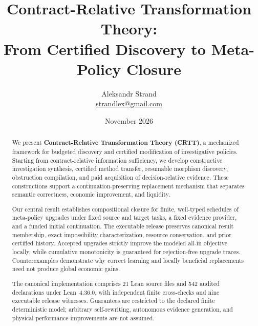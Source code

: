 
\title{\textbf{Contract-Relative Transformation Theory:}\\
\large From Certified Discovery to Meta-Policy Closure}

\author{Aleksandr Strand\\[-1pt]{\small\href{mailto:strandlex@gmail.com}{strandlex@gmail.com}}}
\date{\vspace{-11pt}November 2026}

\maketitle

\begin{abstract}
We present \textbf{Contract-Relative Transformation Theory (CRTT)}, a mechanized framework for budgeted discovery and certified modification of investigative policies. Starting from contract-relative information sufficiency, we develop constructive investigation synthesis, certified method transfer, resumable morphism discovery, obstruction compilation, and paid acquisition of decision-relative evidence. These constructions support a continuation-preserving replacement mechanism that separates semantic correctness, economic improvement, and liquidity.

Our central result establishes compositional closure for finite, well-typed schedules of meta-policy upgrades under fixed source and target tasks, a fixed evidence provider, and a funded initial continuation. The executable release preserves canonical result membership, exact impossibility characterization, resource conservation, and prior certified history. Accepted upgrades strictly improve the modeled all-in objective locally, while cumulative monotonicity is guaranteed for rejection-free upgrade traces. Counterexamples demonstrate why correct learning and locally beneficial replacements need not produce global economic gains.

The canonical implementation comprises 21 Lean source files and 542 audited declarations under Lean~4.36.0, with independent finite cross-checks and nine executable release witnesses. Guarantees are restricted to the declared finite deterministic model; arbitrary self-rewriting, autonomous evidence generation, and physical performance improvements are not assumed.
\end{abstract}

